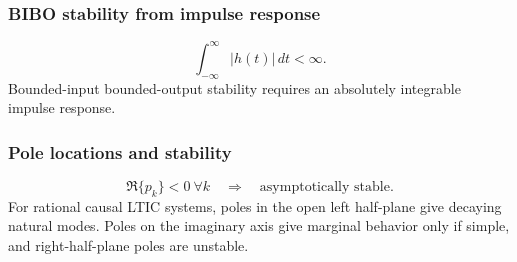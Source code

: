 \subsubsection{BIBO stability from impulse response}
\[
\int_{-\infty}^{\infty}|h(t)|\,dt<\infty.
\]
Bounded-input bounded-output stability requires an absolutely integrable impulse response.

\subsubsection{Pole locations and stability}
\[
\Re\{p_k\}<0 \ \forall k \quad \Rightarrow \quad \text{asymptotically stable}.
\]
For rational causal LTIC systems, poles in the open left half-plane give decaying natural modes. Poles on the imaginary axis give marginal behavior only if simple, and right-half-plane poles are unstable.
